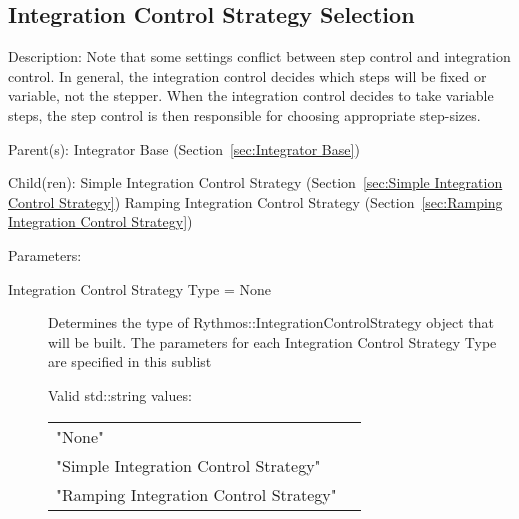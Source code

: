 \subsection{Integration Control Strategy Selection}
\label{sec:Integration Control Strategy Selection}

\begin{list}{}
  {\setlength{\leftmargin}{1.0in}
   \setlength{\labelwidth}{0.75in}
   \setlength{\labelsep}{0.125in}}
  \item[Description:]
    Note that some settings conflict between step control and integration control.  In general, the integration control decides which steps will be fixed or variable, not the stepper.  When the integration control decides to take variable steps, the step control is then responsible for choosing appropriate step-sizes.
  \item[Parent(s):]
    Integrator Base (Section~\ref{sec:Integrator Base})
  \item[Child(ren):]
    Simple Integration Control Strategy (Section~\ref{sec:Simple Integration Control Strategy})
      \newline 
    Ramping Integration Control Strategy (Section~\ref{sec:Ramping Integration Control Strategy})
  \item[Parameters:]
    \begin{description}
      \item[Integration Control Strategy Type = None] 
Determines the type of Rythmos::IntegrationControlStrategy object that will be built.
The parameters for each Integration Control Strategy Type are specified in this sublist

  Valid std::string values:

      \begin{tabular}{lp{}}
      "None" & \\ 
      "Simple Integration Control Strategy" & \\ 
      "Ramping Integration Control Strategy" & \\ 
      \end{tabular}
\end{description}

\end{list}

